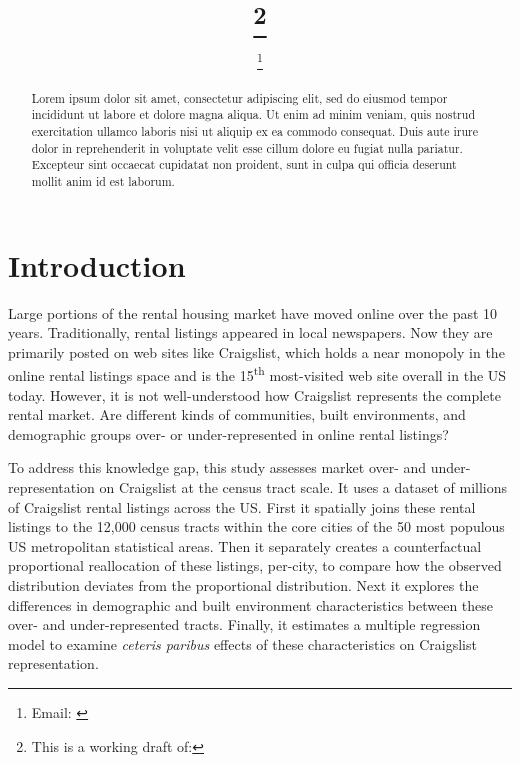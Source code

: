 \documentclass[12pt,onecolumn]{article} %
\begin{document}
	
\title{\papertitle\footnote{This is a working draft of: \papercitation}}
\date{\paperdate}
\author[]{\myname \thanks{Email: \href{mailto:\myemail}{\myemail}}}
\affil[]{\myaffiliation}

\maketitle

\begin{abstract}
Lorem ipsum dolor sit amet, consectetur adipiscing elit, sed do eiusmod tempor incididunt ut labore et dolore magna aliqua. Ut enim ad minim veniam, quis nostrud exercitation ullamco laboris nisi ut aliquip ex ea commodo consequat. Duis aute irure dolor in reprehenderit in voluptate velit esse cillum dolore eu fugiat nulla pariatur. Excepteur sint occaecat cupidatat non proident, sunt in culpa qui officia deserunt mollit anim id est laborum.
\vspace{1cm}
\end{abstract}




\section{Introduction}

Large portions of the rental housing market have moved online over the past 10 years. Traditionally, rental listings appeared in local newspapers. Now they are primarily posted on web sites like Craigslist, which holds a near monopoly in the online rental listings space and is the 15\textsuperscript{th} most-visited web site overall in the US today. However, it is not well-understood how Craigslist represents the complete rental market. Are different kinds of communities, built environments, and demographic groups over- or under-represented in online rental listings?

To address this knowledge gap, this study assesses market over- and under-representation on Craigslist at the census tract scale. It uses a dataset of millions of Craigslist rental listings across the US. First it spatially joins these rental listings to the 12,000 census tracts within the core cities of the 50 most populous US metropolitan statistical areas. Then it separately creates a counterfactual proportional reallocation of these listings, per-city, to compare how the observed distribution deviates from the proportional distribution. Next it explores the differences in demographic and built environment characteristics between these over- and under-represented tracts. Finally, it estimates a multiple regression model to examine \textit{ceteris paribus} effects of these characteristics on Craigslist representation.
\end{document}
